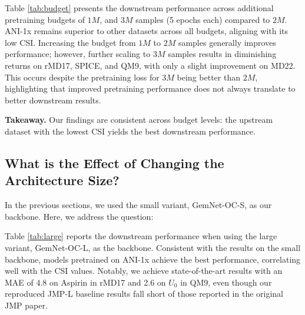 

Table \ref{tab:budget} presents the downstream performance across additional pretraining budgets of \(1M\), and \(3M\) samples (5 epochs each) compared to \(2M\). ANI-1x remains superior to other datasets across all budgets, aligning with its low CSI. Increasing the budget from \(1M\) to \(2M\) samples generally improves performance; however, further scaling to \(3M\) samples results in diminishing returns on rMD17, SPICE, and QM9, with only a slight improvement on MD22. This occurs despite the pretraining loss for \(3M\) being better than \(2M\), highlighting that improved pretraining performance does not always translate to better downstream results.

\textbf{Takeaway.} Our findings are consistent across budget levels: the upstream dataset with the lowest CSI yields the best downstream performance.

\subsection{What is the Effect of Changing the Architecture Size?}
In the previous sections, we used the small variant, GemNet-OC-S, as our backbone. Here, we address the question:


Table \ref{tab:large} reports the downstream performance when using the large variant, GemNet-OC-L, as the backbone. Consistent with the results on the small backbone, models pretrained on ANI-1x achieve the best performance, correlating well with the CSI values. Notably, we achieve state-of-the-art results with an MAE of 4.8 on Aspirin in rMD17 and 2.6 on $U_0$ in QM9, even though our reproduced JMP-L baseline results fall short of those reported in the original JMP paper. 

